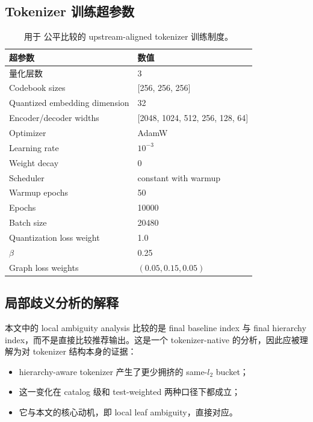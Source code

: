 \subsection{Tokenizer 训练超参数}

\begin{table}[h]
  \centering
  \caption{用于  公平比较的 upstream-aligned tokenizer 训练制度。}
  \label{tab:appendix-train}
  \begin{tabular}{ll}
    \toprule
    超参数 & 数值 \\
    \midrule
    量化层数 & 3 \\
    Codebook sizes & [256, 256, 256] \\
    Quantized embedding dimension & 32 \\
    Encoder/decoder widths & [2048, 1024, 512, 256, 128, 64] \\
    Optimizer & AdamW \\
    Learning rate & $10^{-3}$ \\
    Weight decay & 0 \\
    Scheduler & constant with warmup \\
    Warmup epochs & 50 \\
    Epochs & 10000 \\
    Batch size & 20480 \\
    Quantization loss weight & 1.0 \\
    $\beta$ & 0.25 \\
    Graph loss weights & $(0.05, 0.15, 0.05)$ \\
    \bottomrule
  \end{tabular}
\end{table}

\subsection{局部歧义分析的解释}

本文中的 local ambiguity analysis 比较的是 final baseline index 与 final hierarchy index，而不是直接比较推荐输出。这是一个 tokenizer-native 的分析，因此应被理解为对 tokenizer 结构本身的证据：
\begin{itemize}[leftmargin=1.4em]
  \item hierarchy-aware tokenizer 产生了更少拥挤的 same-$l_2$ bucket；
  \item 这一变化在 catalog 级和 test-weighted 两种口径下都成立；
  \item 它与本文的核心动机，即 local leaf ambiguity，直接对应。
\end{itemize}

